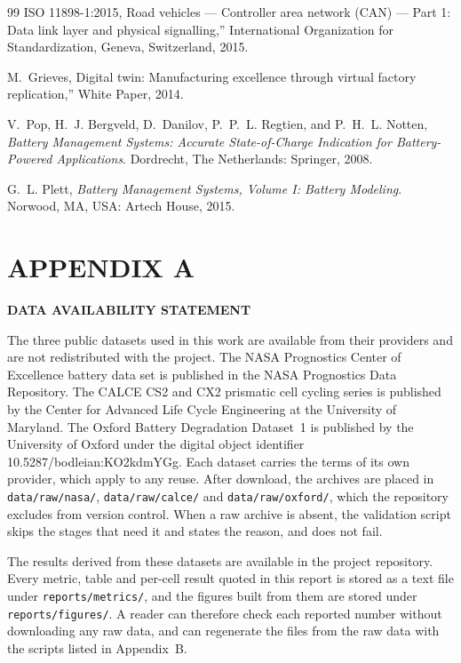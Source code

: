 \documentclass[12pt,a4paper]{amritareport}
\begin{document}
\begin{thebibliography}{99}
{ISO} 11898-1:2015, Road vehicles --- Controller area network ({CAN}) --- Part 1: Data link layer and physical signalling,'' International Organization for Standardization, Geneva, Switzerland, 2015.

M.~Grieves, Digital twin: Manufacturing excellence through virtual factory replication,'' White Paper, 2014.

V.~Pop, H.~J. Bergveld, D.~Danilov, P.~P.~L. Regtien, and P.~H.~L. Notten, \emph{Battery Management Systems: Accurate State-of-Charge Indication for Battery-Powered Applications}. Dordrecht, The Netherlands: Springer, 2008.

G.~L. Plett, \emph{Battery Management Systems, Volume I: Battery Modeling}. Norwood, MA, USA: Artech House, 2015.

\end{thebibliography}


\appendix
\chapter*{APPENDIX A}

\begin{center}
\textbf{DATA AVAILABILITY STATEMENT}
\end{center}

The three public datasets used in this work are available from their providers and are not redistributed with the project. The NASA Prognostics Center of Excellence battery data set \cite{saha2007} is published in the NASA Prognostics Data Repository. The CALCE CS2 and CX2 prismatic cell cycling series \cite{calce} is published by the Center for Advanced Life Cycle Engineering at the University of Maryland. The Oxford Battery Degradation Dataset~1 \cite{howey2017oxford} is published by the University of Oxford under the digital object identifier 10.5287/bodleian:KO2kdmYGg. Each dataset carries the terms of its own provider, which apply to any reuse. After download, the archives are placed in \texttt{data/raw/nasa/}, \texttt{data/raw/calce/} and \texttt{data/raw/oxford/}, which the repository excludes from version control. When a raw archive is absent, the validation script skips the stages that need it and states the reason, and does not fail.

The results derived from these datasets are available in the project repository. Every metric, table and per-cell result quoted in this report is stored as a text file under \texttt{reports/}\allowbreak\texttt{metrics/}, and the figures built from them are stored under \texttt{reports/}\allowbreak\texttt{figures/}. A reader can therefore check each reported number without downloading any raw data, and can regenerate the files from the raw data with the scripts listed in Appendix~B.
\end{document}
